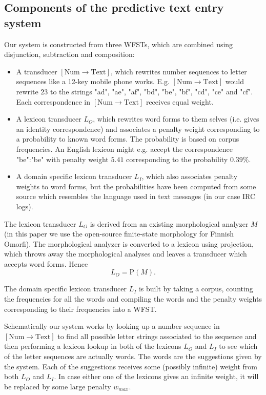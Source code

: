 \documentclass[a4paper,conference]{IEEEtran}
\begin{document}
\subsection{Components of the predictive text entry system}

Our system is constructed from three WFSTs, which are combined using
disjunction, subtraction and composition:

\begin{itemize}
\item A transducer $[\mathrm{Num}\rightarrow\mathrm{Text}]$, which
  rewrites number sequences to letter sequences like a 12-key mobile phone
  works. E.g. $[\mathrm{Num}\rightarrow\mathrm{Text}]$ would rewrite
  $23$ to the strings "ad", "ae", "af", "bd", "be", "bf", "cd", "ce"
  and "cf". Each correspondence in $[\mathrm{Num}\rightarrow\mathrm{Text}]$
  receives equal weight.
\item A lexicon transducer $L_O$, which rewrites word forms to them
  selves (i.e. gives an identity correspondence) and associates a
  penalty weight corresponding to a probability to known word
  forms. The probability is based on corpus frequencies. An English
  lexicon might e.g. accept the correspondence "be":"be" with penalty
  weight $5.41$ corresponding to the probability $0.39\%$.
\item A domain specific lexicon transducer $L_I$, which also
  associates penalty weights to word forms, but the probabilities have
  been computed from some source which resembles the language used in
  text messages (in our case IRC logs).
\end{itemize}

The lexicon transducer $L_O$ is derived from an existing morphological
analyzer $M$ (in this paper we use the open-source finite-state
morphology for Finnish Omorfi). The morphological analyzer is
converted to a lexicon using projection, which throws away the
morphological analyses and leaves a transducer which accepts
word forms. Hence
\begin{equation}L_O = \mathrm{P}(M)\text{.}\end{equation}

The domain specific lexicon transducer $L_I$ is built by taking a
corpus, counting the frequencies for all the words and compiling the
words and the penalty weights corresponding to their frequencies into
a WFST.

Schematically our system works by looking up a number sequence in
$[\mathrm{Num}\rightarrow\mathrm{Text}]$ to find all possible letter
strings associated to the sequence and then performing a lexicon
lookup in both of the lexicons $L_O$ and $L_I$ to see which of the
letter sequences are actually words. The words are the suggestions
given by the system. Each of the suggestions receives some (possibly
infinite) weight from both $L_O$ and $L_I$. In case either one of the
lexicons gives an infinite weight, it will be replaced by some large
penalty $w_{max}$. 
\end{document}

